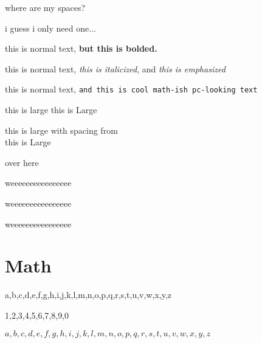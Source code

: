 \documentclass[11pt, oneside]{article}   	%
\begin{document}
where are my spaces?

i guess i only need one...


\vspace{60pt} 

this is normal text, \textbf{but this is bolded.}

this is normal text, \textit{this is italicized}, and \emph{this is emphasized}


\vspace{36pt}

this is normal text, \texttt{and this is cool math-ish pc-looking text}

{\large this is large} 
{\Large this is Large}

{\large this is large with spacing from} \\
{\Large this is Large}

\vspace{1in}


\hspace{200pt} over here


\hspace{2in} weeeeeeeeeeeeeeee

\hspace{7in} weeeeeeeeeeeeeeee

\hspace{-1.5in} weeeeeeeeeeeeeeee



\newpage



\section{Math} \noindent

a,b,c,d,e,f,g,h,i,j,k,l,m,n,o,p,q,r,s,t,u,v,w,x,y,z

1,2,3,4,5,6,7,8,9,0

$a,b,c,d,e,f,g,h,i,j,k,l,m,n,o,p,q,r,s,t,u,v,w,x,y,z$
\end{document}
